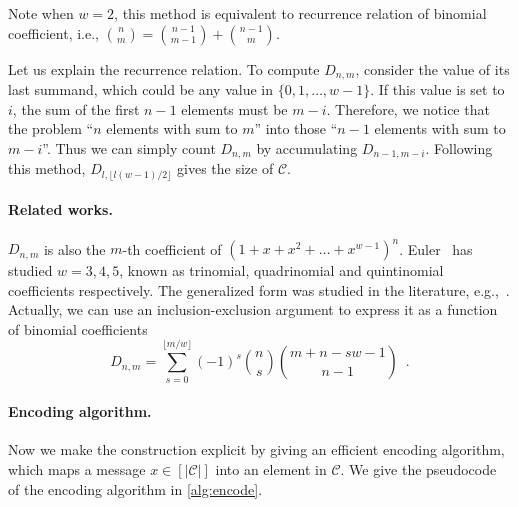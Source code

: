 Note when $w=2$, this method is equivalent to recurrence relation of binomial coefficient, i.e., $\binom{n}{m}=\binom{n-1}{m-1}+\binom{n-1}{m}$.

Let us explain the recurrence relation. To compute $D_{n,m}$,  consider the value of its last summand, which could be any value in $\{0,1,\dots,w-1\}$. If this value is set to $i$, the sum of the first $n-1$ elements must be $m-i$. Therefore, we notice that  the problem ``$n$ elements with sum to $m$'' into those ``$n-1$ elements with sum to $m-i$''. Thus we can simply count $D_{n,m}$ by accumulating $D_{n-1,m-i}$.
Following this method, $D_{l,\lfloor l(w-1)/2 \rfloor}$ gives the size of $\mathcal{C}$.

\paragraph{Related works.} $D_{n,m}$ is also the $m$-th coefficient of $(1+x+x^2+\dots+x^{w-1})^n$. Euler~\cite{euler1801evolutione} has studied $w=3,4,5$, known as trinomial, quadrinomial and quintinomial  coefficients respectively. The generalized form was  studied in the literature, e.g.,~\cite{andre1876memoire,warnaar1997andrews,belbachir2020congruence}. Actually, we can use an inclusion-exclusion argument to express it as a function of binomial coefficients~\cite{28861}
$$ D_{n,m} = \sum_{s=0}^{\lfloor{m/w}\rfloor} (-1)^s \binom{n}{s} \binom{m+n-sw-1}{n-1} \enspace .$$

\paragraph{Encoding algorithm.} Now we make the construction explicit by giving an efficient encoding algorithm, which maps a message $x\in [|\mathcal{C}|]$ into an element in $\mathcal{C}$.
We give the pseudocode of the encoding algorithm in \cref{alg:encode}.
\begin{algorithm}
\caption{Encode:$[|\mathcal{C}|]\rightarrow\mathcal{C}$.} \label{alg:encode}
\end{algorithm}

